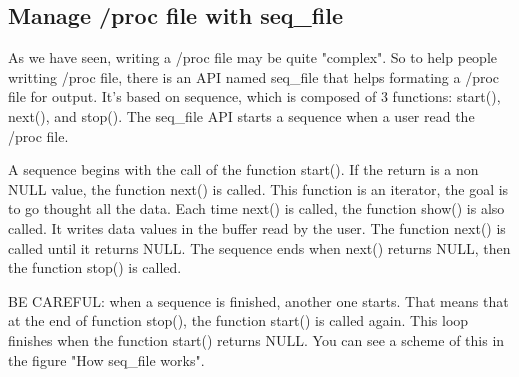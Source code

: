 \documentclass[10pt, oneside]{book}
\begin{document}
\subsection{Manage /proc file with seq\_file}
\label{sec:orgf5ad3c9}
As we have seen, writing a /proc file may be quite "complex". So to help
people writting /proc file, there is an API named seq\_file that helps
formating a /proc file for output. It's based on sequence, which is composed of 3 functions: start(), next(), and stop(). The seq\_file API starts a sequence when a user read the /proc file.

A sequence begins with the call of the function start(). If the return is a
non NULL value, the function next() is called. This function is an iterator, the goal is to go thought all the data. Each time next() is called, the function show() is also called. It writes data values in the buffer read by the user. The function next() is called until it returns NULL. The sequence ends when next() returns NULL, then the function stop() is called.

BE CAREFUL: when a sequence is finished, another one starts. That means that at the end of function stop(), the function start() is called again. This loop finishes when the function start() returns NULL. You can see a scheme of this in the figure "How seq\_file works".

\begin{center}
\end{center}
\end{document}
